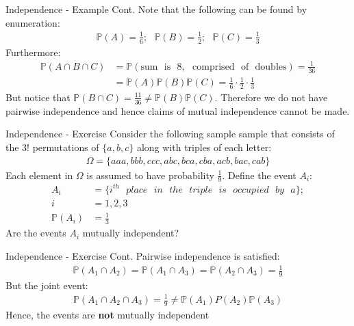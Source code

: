\documentclass{beamer}
\begin{document}
\begin{frame}{Independence - Example Cont.}
Note that the following can be found by enumeration:
\begin{align*}
\mathbb{P}(A) = \frac{1}{6}; \>\>\> \mathbb{P}(B) = \frac{1}{2}; \>\>\> \mathbb{P}(C) = \frac{1}{3}
\end{align*}
Furthermore:
\begin{align*}
\mathbb{P}(A\cap B\cap C ) &= \mathbb{P}(\mathrm{sum \>\>\> is \>\>\> 8, \>\>\> comprised \>\>\> of \>\>\> doubles }) = \frac{1}{36} \\
&= \mathbb{P}(A)\mathbb{P}(B)\mathbb{P}(C) = \frac{1}{6}\cdot \frac{1}{2} \cdot \frac{1}{3}
\end{align*}
But  notice that $\mathbb{P}(B \cap C) = \frac{11}{36} \neq \mathbb{P}(B)\mathbb{P}(C)$. Therefore we do not have pairwise independence and hence claims of mutual independence cannot be made. 
\end{frame}

\begin{frame}{Independence - Exercise}
Consider the following sample sample that consists of the 3! permutations of $\{a, b, c\}$  along with triples of each letter:
\begin{align*}
\Omega = \{aaa, bbb, ccc, abc, bca, cba, acb, bac, cab\}
\end{align*}
Each element in $\Omega$ is assumed to have probability $\frac{1}{9}$. Define the event $A_{i}$:
\begin{align*}
A_{i} &= \{i^{th}\>\>\> place \>\>\> in \>\>\> the \>\>\> triple \>\>\> is \>\>\> occupied \>\>\> by \>\>\> a \};\\ i &= 1,2,3 \\
\mathbb{P}(A_{i}) &= \frac{1}{3}
\end{align*}
Are the events $A_{i}$ mutually independent?
\end{frame}

\begin{frame}{Independence - Exercise Cont.}
Pairwise independence is satisfied:
\begin{align*}
\mathbb{P}(A_{1} \cap A_{2}) = \mathbb{P}(A_{1} \cap A_{3}) = \mathbb{P}(A_{2} \cap A_{3}) = \frac{1}{9}
\end{align*}
But the joint event:
\begin{align*}
\mathbb{P}(A_{1}\cap A_{2} \cap A_{3})  = \frac{1}{9} \neq \mathbb{P}(A_{1})P(A_{2})\mathbb{P}(A_{3})
\end{align*}
Hence, the events are \textbf{not} mutually independent
\end{frame}
\end{document}

